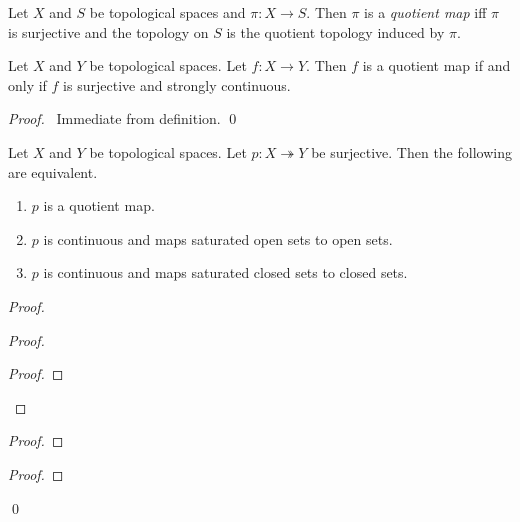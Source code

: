 \begin{df}
Let $X$ and $S$ be topological spaces and $\pi : X \rightarrow S$. Then $\pi$ is a \emph{quotient map} iff $\pi$ is surjective and the topology on $S$ is the quotient topology induced by $\pi$.
\end{df}

\begin{prop}
Let $X$ and $Y$ be topological spaces. Let $f : X \rightarrow Y$. Then $f$ is a quotient map if and only if $f$ is surjective and strongly continuous.
\end{prop}

\begin{proof}
\pf\ Immediate from definition. \qed
\end{proof}

\begin{prop}
Let $X$ and $Y$ be topological spaces. Let $p : X \twoheadrightarrow Y$ be surjective. Then the following are equivalent.
\begin{enumerate}
\item $p$ is a quotient map.
\item $p$ is continuous and maps saturated open sets to open sets.
\item $p$ is continuous and maps saturated closed sets to closed sets.
\end{enumerate}
\end{prop}

\begin{proof}
\pf
{}
\begin{proof}
	\begin{proof}
	\end{proof}
\end{proof}
\begin{proof}
\end{proof}
\begin{proof}
\end{proof}
\qed
\end{proof}

